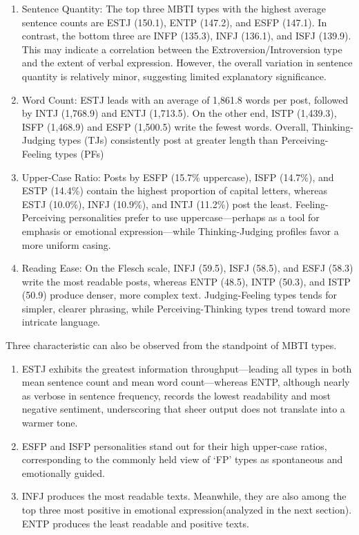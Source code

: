 \documentclass[12pt]{article}
\numberwithin{figure}{section}  %
\begin{document}
	\begin{enumerate}
	\item Sentence Quantity: The top three MBTI types with the highest average
	sentence counts are ESTJ (150.1), ENTP (147.2), and ESFP (147.1). In
	contrast, the bottom three are INFP (135.3), INFJ (136.1), and ISFJ (139.9).
	This may indicate a correlation between the Extroversion/Introversion type
	and the extent of verbal expression. However, the overall variation in
	sentence quantity is relatively minor, suggesting limited explanatory
	significance.
	\item Word Count: ESTJ leads with an average of 1,861.8 words per post,
	followed by INTJ (1,768.9) and ENTJ (1,713.5). On the other end, ISTP
	(1,439.3), ISFP (1,468.9) and ESFP (1,500.5) write the fewest words.
	Overall, Thinking-Judging types (TJs) consistently post at greater length
	than Perceiving-Feeling types (PFs)
	\item Upper-Case Ratio:  Posts by ESFP (15.7\% uppercase), ISFP (14.7\%),
	and ESTP (14.4\%) contain the highest proportion of capital letters, whereas
	ESTJ (10.0\%), INFJ (10.9\%), and INTJ (11.2\%) post the least.
	Feeling-Perceiving personalities prefer to use uppercase—perhaps as a tool
	for emphasis or emotional expression—while Thinking-Judging profiles favor a
	more uniform casing. 
	\item Reading Ease: On the Flesch scale, INFJ (59.5), ISFJ (58.5), and ESFJ
	(58.3) write the most readable posts, whereas ENTP (48.5), INTP (50.3), and
	ISTP (50.9) produce denser, more complex text. Judging-Feeling types tends
	for simpler, clearer phrasing, while Perceiving-Thinking types trend toward
	more intricate language.
	\end{enumerate}
	
	Three characteristic can also be observed from the standpoint of MBTI types.
	\begin{enumerate}
	\item ESTJ exhibits the greatest information throughput—leading all types in
	both mean sentence count and mean word count—whereas ENTP, although nearly
	as verbose in sentence frequency, records the lowest readability and most
	negative sentiment, underscoring that sheer output does not translate into a
	warmer tone.
	\item ESFP and ISFP personalities stand out for their high upper-case
	ratios, corresponding to the commonly held view of ‘FP’ types as spontaneous
	and emotionally guided.
	\item INFJ produces the most readable texts. Meanwhile, they are also among
	the top three most positive in emotional expression(analyzed in the next
	section). ENTP produces the least readable and positive texts.

	\end{enumerate}
	 
\end{document}
